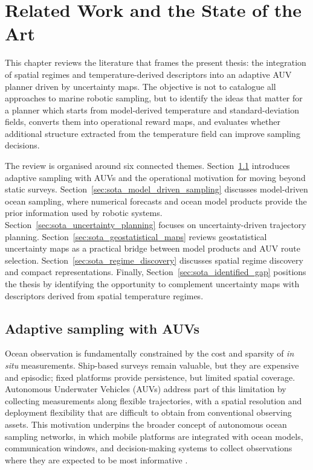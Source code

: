\chapter{Related Work and the State of the Art}
\label{chap:state_of_art_restructured}

This chapter reviews the literature that frames the present thesis: the integration of spatial regimes and temperature-derived descriptors into an adaptive AUV planner driven by uncertainty maps. The objective is not to catalogue all approaches to marine robotic sampling, but to identify the ideas that matter for a planner which starts from model-derived temperature and standard-deviation fields, converts them into operational reward maps, and evaluates whether additional structure extracted from the temperature field can improve sampling decisions.

The review is organised around six connected themes. Section~\ref{sec:sota_adaptive_sampling_auvs} introduces adaptive sampling with AUVs and the operational motivation for moving beyond static surveys. Section~\ref{sec:sota_model_driven_sampling} discusses model-driven ocean sampling, where numerical forecasts and ocean model products provide the prior information used by robotic systems. Section~\ref{sec:sota_uncertainty_planning} focuses on uncertainty-driven trajectory planning. Section~\ref{sec:sota_geostatistical_maps} reviews geostatistical uncertainty maps as a practical bridge between model products and AUV route selection. Section~\ref{sec:sota_regime_discovery} discusses spatial regime discovery and compact representations. Finally, Section~\ref{sec:sota_identified_gap} positions the thesis by identifying the opportunity to complement uncertainty maps with descriptors derived from spatial temperature regimes.

\section{Adaptive sampling with AUVs}
\label{sec:sota_adaptive_sampling_auvs}

Ocean observation is fundamentally constrained by the cost and sparsity of \emph{in situ} measurements. Ship-based surveys remain valuable, but they are expensive and episodic; fixed platforms provide persistence, but limited spatial coverage. Autonomous Underwater Vehicles (AUVs) address part of this limitation by collecting measurements along flexible trajectories, with a spatial resolution and deployment flexibility that are difficult to obtain from conventional observing assets. This motivation underpins the broader concept of autonomous ocean sampling networks, in which mobile platforms are integrated with ocean models, communication windows, and decision-making systems to collect observations where they are expected to be most informative \parencite{curtin2009aosn}.

